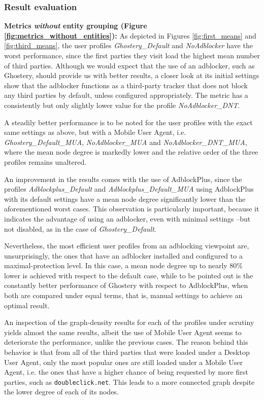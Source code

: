 \documentclass{sig-alternate}
\begin{document}
\subsubsection{Result evaluation}
{\color{blue}
\textbf{Metrics \textit{without} entity grouping (Figure \ref{fig:metrics_without_entities}):} As depicted in Figures \ref{fig:first_means} and \ref{fig:third_means}, the user profiles \textit{Ghostery\_Default} and \textit{NoAdblocker} have the worst performance, since the first parties they visit load the highest mean number of third parties. Although we would expect that the use of an adblocker, such as Ghostery, should provide us with better results, a closer look at its initial settings show that the adblocker functions as a third-party tracker that does not block any third parties by default, unless configured appropriately. The metric has a consistently but only slightly lower value for the profile \textit{NoAdblocker\_DNT}.

A steadily better performance is to be noted for the user profiles with the exact same settings as above, but with a Mobile User Agent, i.e. \textit{Ghostery\_Default\_MUA}, \textit{NoAdblocker\_MUA} and \textit{NoAdblocker\_DNT\_MUA}, where the mean node degree is markedly lower and the relative order of the three profiles remains unaltered.

An improvement in the results comes with the use of AdblockPlus, since the profiles \textit{Adblockplus\_Default} and \textit{Adblockplus\_Default\_MUA} using AdblockPlus with its default settings have a mean node degree significantly lower than the aforementioned worst cases. This observation is particularly important, because it indicates the advantage of using an adblocker, even with minimal settings --but not disabled, as in the case of \textit{Ghostery\_Default}.

Nevertheless, the most efficient user profiles from an adblocking viewpoint are, unsurprisingly, the ones that have an adblocker installed and configured to a maximal-protection level. In this case, a mean node degree up to nearly 80\% lower is achieved with respect to the default case, while to be pointed out is the constantly better performance of Ghostery with respect to AdblockPlus, when both are compared under equal terms, that is, manual settings to achieve an optimal result.

An inspection of the graph-density results for each of the profiles under scrutiny yields almost the same results, albeit the use of Mobile User Agent seems to deteriorate the performance, unlike the previous cases. The reason behind this behavior is that from all of the third parties that were loaded under a Desktop User Agent, only the most popular ones are still loaded under a Mobile User Agent, i.e. the ones that have a higher chance of being requested by more first parties, such as \texttt{doubleclick.net}. This leads to a more connected graph despite the lower degree of each of its nodes.

}
\end{document}
